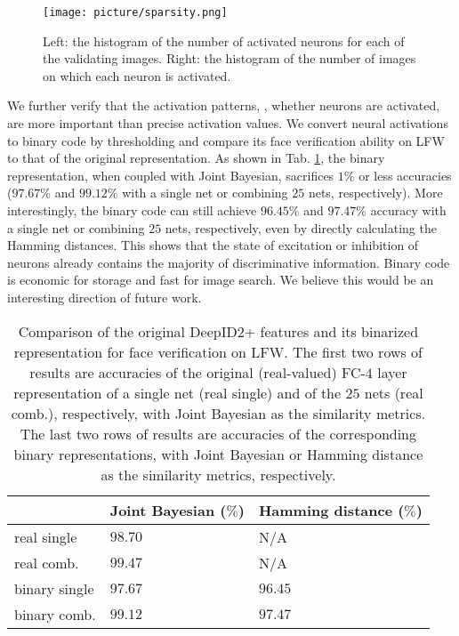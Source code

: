\documentclass[10pt,twocolumn,letterpaper]{article}
\begin{document}
\begin{figure}[!h]
\begin{center}
\texttt{[image: picture/sparsity.png]}
\end{center}
\vspace{-0.15in}
\caption{Left: the histogram of the number of activated neurons for each of the validating images. Right: the histogram of the number of images on which each neuron is activated.}
\label{fig:sparsity}
\vspace{-0.05in}
\end{figure}

We further verify that the activation patterns, \ie, whether neurons are activated, are more important than precise activation values. We convert neural activations to binary code by thresholding and compare its face verification ability on LFW to that of the original representation. As shown in Tab. \ref{tab:sparsity}, the binary representation, when coupled with Joint Bayesian, sacrifices $1\%$ or less accuracies ($97.67\%$ and $99.12\%$ with a single net or combining $25$ nets, respectively). More interestingly, the binary code can still achieve $96.45\%$ and $97.47\%$ accuracy with a single net or combining $25$ nets, respectively, even by directly calculating the Hamming distances. This shows that the state of excitation or inhibition of neurons already contains the majority of discriminative information. Binary code is economic for storage and fast for image search. We believe this would be an interesting direction of future work.

\begin{table}[t]
\caption{Comparison of the original DeepID2+ features and its binarized representation for face verification on LFW. The first two rows of results are accuracies of the original (real-valued) FC-$4$ layer representation of a single net (real single) and of the $25$ nets (real comb.), respectively, with Joint Bayesian as the similarity metrics. The last two rows of results are accuracies of the corresponding binary representations, with Joint Bayesian or Hamming distance as the similarity metrics, respectively.}
\vspace{-0.1in}
\label{tab:sparsity}
\begin{center}
\begin{tabular}{p{60pt}|p{60pt}|p{60pt}}
\toprule
 & Joint Bayesian ($\%$) & Hamming distance ($\%$) \\
\midrule
real single & $98.70$ & N/A \\
real comb. & $99.47$ & N/A \\
binary single & $97.67$ & $96.45$ \\
binary comb. & $99.12$ & $97.47$ \\
\bottomrule
\end{tabular}
\end{center}
\vspace{-0.1in}
\end{table}
\end{document}
